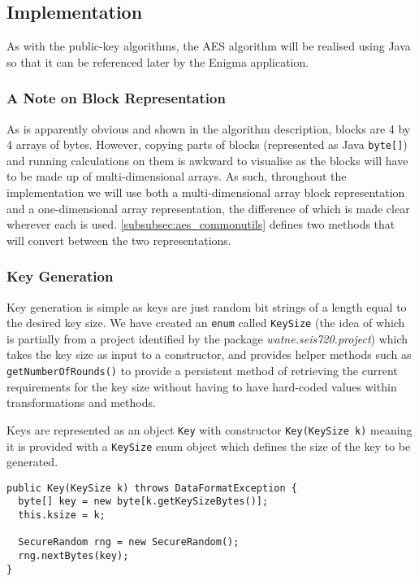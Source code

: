   \subsection{Implementation}
  
  As with the public-key algorithms, the AES algorithm will be realised using Java so that it can be referenced later by the Enigma application.
  
    \subsubsection{A Note on Block Representation}
    
    As is apparently obvious and shown in the algorithm description, blocks are 4 by 4 arrays of bytes. However, copying parts of blocks (represented as Java \verb!byte[]!) and running calculations on them is awkward to visualise as the blocks will have to be made up of multi-dimensional arrays. As such, throughout the implementation we will use both a multi-dimensional array block representation and a one-dimensional array representation, the difference of which is made clear wherever each is used. \textsection\ref{subsubsec:aes_commonutils} defines two methods that will convert between the two representations.
    
    \subsubsection{Key Generation}
    
    Key generation is simple as keys are just random bit strings of a length equal to the desired key size. We have created an \verb!enum! called \verb!KeySize! (the idea of which is partially from a project identified by the package \emph{watne.seis720.project}) which takes the key size as input to a constructor, and provides helper methods such as \verb!getNumberOfRounds()! to provide a persistent method of retrieving the current requirements for the key size without having to have hard-coded values within transformations and methods.
    
    Keys are represented as an object \verb!Key! with constructor \verb!Key(KeySize k)! meaning it is provided with a \verb!KeySize! enum object which defines the size of the key to be generated. \\
    
    \begin{lstlisting}
public Key(KeySize k) throws DataFormatException {
  byte[] key = new byte[k.getKeySizeBytes()];
  this.ksize = k;
  
  SecureRandom rng = new SecureRandom();
  rng.nextBytes(key);
}
\end{lstlisting}
    
